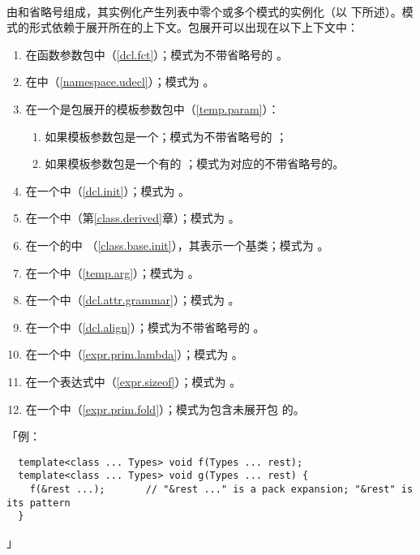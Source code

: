 \paragraph{}
由和省略号组成，其实例化产生列表中零个或多个模式的实例化（以
下所述）。模式的形式依赖于展开所在的上下文。包展开可以出现在以下上下文中：
\begin{enumerate}
  \item{在函数参数包中（\ref{dcl.fct}）；模式为不带省略号的
    。}
  \item{在中（\ref{namespace.udecl}）；模式为
    。}
  \item{在一个是包展开的模板参数包中（\ref{temp.param}）：
    \begin{enumerate}
      \item{如果模板参数包是一个；模式为不带省略号的
        ；}
      \item{如果模板参数包是一个有的
        ；模式为对应的不带省略号的。}
    \end{enumerate}}
  \item{在一个中（\ref{dcl.init}）；模式为
    。}
  \item{在一个中（第\ref{class.derived}章）；模式为
    。}
  \item{在一个的中
    （\ref{class.base.init}），其表示一个基类；模式为
    。}
  \item{在一个中（\ref{temp.arg}）；模式为
    。}
  \item{在一个中（\ref{dcl.attr.grammar}）；模式为
    。}
  \item{在一个中（\ref{dcl.align}）；模式为不带省略号的
    。}
  \item{在一个中（\ref{expr.prim.lambda}）；模式为
    。}
  \item{在一个表达式中（\ref{expr.sizeof}）；模式为
    。}
  \item{在一个中（\ref{expr.prim.fold}）；模式为包含未展开包
    的。}
\end{enumerate}
「例：
\begin{lstlisting}
  template<class ... Types> void f(Types ... rest);
  template<class ... Types> void g(Types ... rest) {
    f(&rest ...);       // "&rest ..." is a pack expansion; "&rest" is its pattern
  }
\end{lstlisting}」

